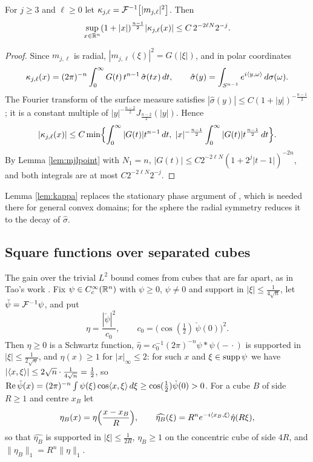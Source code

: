 \begin{lemma}\label{lem:kappa}
For $j\ge3$ and $\ell\ge0$ let $\kappa_{j,\ell}=\mathcal F^{-1}\bigl[|m_{j,\ell}|^2\bigr]$. Then
\[
\sup_{x\in\mathbb{R}^n}(1+|x|)^{\frac{n-1}2}|\kappa_{j,\ell}(x)|\le C\,2^{-2\ell N}2^{-j}.
\]
\end{lemma}

\begin{proof}
Since $m_{j,\ell}$ is radial, $|m_{j,\ell}(\xi)|^2=G(|\xi|)$, and in polar coordinates
\[
\kappa_{j,\ell}(x)=(2\pi)^{-n}\int_0^\infty G(t)\,t^{n-1}\,\hat\sigma(tx)\,dt,\qquad
\hat\sigma(y)=\int_{S^{n-1}}e^{i\langle y,\omega\rangle}\,d\sigma(\omega).
\]
The Fourier transform of the surface measure satisfies $|\hat\sigma(y)|\le C(1+|y|)^{-\frac{n-1}2}$
\cite[Ch.~VIII, \S3.1]{Ste93}; it is a constant multiple of $|y|^{-\frac{n-2}2}J_{\frac{n-2}2}(|y|)$. Hence
\[
|\kappa_{j,\ell}(x)|\le C\min\Bigl\{\int_0^\infty|G(t)|t^{n-1}\,dt,\;|x|^{-\frac{n-1}2}\int_0^\infty|G(t)|t^{\frac{n-1}2}\,dt\Bigr\}.
\]
By Lemma \ref{lem:mjlpoint} with $N_1=n$, $|G(t)|\le C2^{-2\ell N}(1+2^j|t-1|)^{-2n}$, and both integrals are
at most $C2^{-2\ell N}2^{-j}$.
\end{proof}

Lemma \ref{lem:kappa} replaces the stationary phase argument of \cite{BRS23}, which is needed there for
general convex domains; for the sphere the radial symmetry reduces it to the decay of $\hat\sigma$.

\subsection{Square functions over separated cubes}\label{ssec:separated}
The gain over the trivial $L^2$ bound comes from cubes that are far apart, as in Tao's work
\cite{Tao98}. Fix $\psi\in C^\infty_c(\mathbb{R}^n)$ with $\psi\ge0$, $\psi\ne0$ and support in
$|\xi|\le\frac1{4\sqrt n}$, let $\check\psi=\mathcal F^{-1}\psi$, and put
\[
\eta=\frac{|\check\psi|^2}{c_0},\qquad c_0=\bigl(\cos(\tfrac12)\,\check\psi(0)\bigr)^2 .
\]
Then $\eta\ge0$ is a Schwartz function, $\hat\eta=c_0^{-1}(2\pi)^{-n}\psi*\psi(-\,\cdot)$ is supported in
$|\xi|\le\frac1{2\sqrt n}$, and $\eta(x)\ge1$ for $|x|_\infty\le2$: for such $x$ and $\xi\in\operatorname{supp}\psi$ we have
$|\langle x,\xi\rangle|\le2\sqrt n\cdot\frac1{4\sqrt n}=\frac12$, so
$\operatorname{Re}\check\psi(x)=(2\pi)^{-n}\int\psi(\xi)\cos\langle x,\xi\rangle\,d\xi\ge\cos(\frac12)\check\psi(0)>0$. For a cube $B$ of
side $R\ge1$ and centre $x_B$ let
\begin{equation}\label{eq:etaB}
\eta_B(x)=\eta\Bigl(\frac{x-x_B}R\Bigr),\qquad \widehat{\eta_B}(\xi)=R^ne^{-i\langle x_B,\xi\rangle}\hat\eta(R\xi),
\end{equation}
so that $\widehat{\eta_B}$ is supported in $|\xi|\le\frac1{2R}$, $\eta_B\ge1$ on the concentric cube of side
$4R$, and $\|\eta_B\|_1=R^n\|\eta\|_1$.

